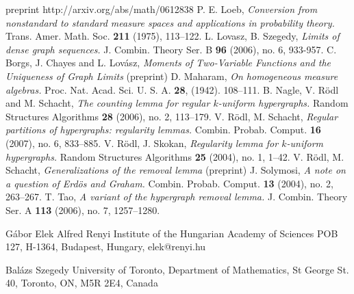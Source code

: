 \documentclass [11pt] {article}
\begin{document}
\begin{thebibliography}{99}
\noindent
preprint
http://arxiv.org/abs/math/0612838
 P. E. Loeb,
{\em Conversion from nonstandard to standard measure spaces and applications
in probability theory.}
Trans. Amer. Math. Soc.  {\bf 211}  (1975), 113--122.
 L. Lovasz, B. Szegedy,
{\em Limits of dense graph sequences.}
J. Combin. Theory Ser. B {\bf 96} (2006), no. 6, 933-957.
 C. Borgs, J. Chayes and L. Lov\'asz,
{\em Moments of Two-Variable Functions and the Uniqueness of Graph Limits}
(preprint)
 D. Maharam,
{\em On homogeneous measure algebras. }
Proc. Nat. Acad. Sci. U. S. A.  {\bf28},  (1942). 108--111.
 B. Nagle, V. R\"odl and M. Schacht,
{\em The counting lemma for regular $k$-uniform hypergraphs.}
Random Structures Algorithms {\bf 28}  (2006),  no. 2, 113--179.
 V. R\"odl, M. Schacht,
{\em  Regular partitions of hypergraphs: regularity lemmas.}
 Combin. Probab. Comput. {\bf 16}  (2007),  no. 6, 833--885.
 V. R\"odl, J. Skokan,
{\em Regularity lemma for $k$-uniform hypergraphs.}
Random Structures Algorithms {\bf 25} (2004), no. 1, 1--42.
 V. R\"odl, M. Schacht,
{\em Generalizations of the removal lemma} (preprint)
J. Solymosi,
{\em A note on a question of Erd\"os and Graham. }
Combin. Probab. Comput. {\bf 13}  (2004),  no. 2, 263--267.
 T. Tao,
{\em A variant of the hypergraph removal lemma.}
J. Combin. Theory Ser. A {\bf 113} (2006), no. 7, 1257--1280.




\end{thebibliography}

\noindent
G\'abor Elek
\noindent
Alfred Renyi Institute of the Hungarian Academy of Sciences
\noindent
POB 127, H-1364, Budapest, Hungary,  elek@renyi.hu



\vskip 0.2in

\noindent
Bal\'azs Szegedy
\noindent
University of Toronto, Department of Mathematics,
\noindent
St George St. 40, Toronto, ON, M5R 2E4, Canada
\end{document}
